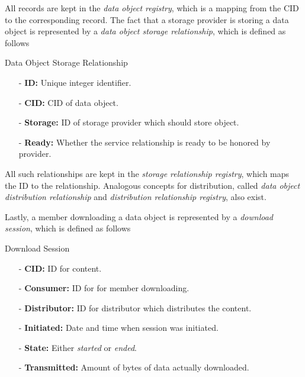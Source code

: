\documentclass{article}
\newenvironment{concept_box}[1]
    {
    \begin{tcolorbox}
    {\large \textbf{#1} }
    }
    {
    \end{tcolorbox}
    }
\begin{document}
All records are kept in the \textit{data object registry}, which is a mapping from the CID to the corresponding record. The fact that a storage provider is storing a data object is represented by a \textit{data object storage relationship}, which is defined as follows \\

\begin{concept_box}{Data Object Storage Relationship}
    \begin{itemize}

      \item[-] \textbf{ID:} Unique integer identifier.

      \item[-] \textbf{CID:} CID of data object.

      \item[-] \textbf{Storage:} ID of storage provider which should store object.

      \item[-] \textbf{Ready:} Whether the service relationship is ready to be honored by provider.

    \end{itemize}
\end{concept_box}

All such relationships are kept in the \textit{storage relationship registry}, which maps the ID to the relationship. Analogous concepts for distribution, called \textit{data object distribution relationship} and \textit{distribution relationship registry}, also exist.

Lastly, a member downloading a data object is represented by a \textit{download session}, which is defined as follows \\

\begin{concept_box}{Download Session}

    \begin{itemize}

      \item[-] \textbf{CID:} ID for content.

      \item[-] \textbf{Consumer:} ID for for member downloading.

      \item[-] \textbf{Distributor:} ID for distributor which distributes the content.

      \item[-] \textbf{Initiated:} Date and time when session was initiated.

      \item[-] \textbf{State:} Either \textit{started} or \textit{ended}.

      \item[-] \textbf{Transmitted:} Amount of bytes of data actually downloaded.

    \end{itemize}

\end{concept_box}
\end{document}
